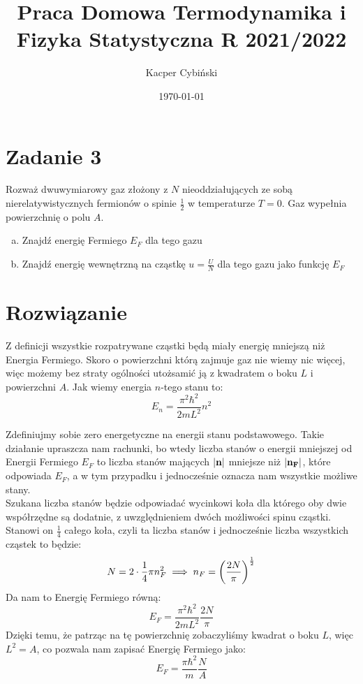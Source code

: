 \documentclass[12pt,a4paper]{article}
\title{Praca Domowa Termodynamika i Fizyka Statystyczna R 2021/2022}
\author{Kacper Cybiński}
\date{\today}
\begin{document}
\maketitle

\section{Zadanie 3}

Rozważ dwuwymiarowy gaz złożony z $N$ nieoddziałujących ze sobą nierelatywistycznych fermionów o spinie $\frac12$ w temperaturze $T = 0$. Gaz wypełnia powierzchnię o polu $A$.
\begin{enumerate}[a)]
    \item Znajdź energię Fermiego $E_F$ dla tego gazu \label{pkt_A}
    \item Znajdź energię wewnętrzną na cząstkę $u = \frac{U}{N}$ dla tego gazu jako funkcję $E_F$ \label{pkt_B}
\end{enumerate}

\section{Rozwiązanie}

Z definicji wszystkie rozpatrywane cząstki będą miały energię mniejszą niż Energia Fermiego. Skoro o powierzchni którą zajmuje gaz nie wiemy nic więcej, więc możemy bez straty ogólności utożsamić ją z kwadratem o boku $L$ i powierzchni $A$. Jak wiemy energia $n$-tego stanu to:
\[
    E_n = \frac{\pi^2 \hbar^2}{2 m L^2} n^2    
\]

Zdefiniujmy sobie zero energetyczne na energii stanu podstawowego. Takie działanie upraszcza nam rachunki, bo wtedy liczba stanów o energii mniejszej od Energii Fermiego $E_F$ to liczba stanów mających $\abs{\vb{n}}$ mniejsze niż $\abs{\vb{n_F}}$, które odpowiada $E_F$, a w tym przypadku i jednocześnie oznacza nam wszystkie możliwe stany.\\
Szukana liczba stanów będzie odpowiadać wycinkowi koła dla którego oby dwie współrzędne są dodatnie, z uwzględnieniem dwóch możliwości spinu cząstki. Stanowi on $\frac14$ całego koła, czyli ta liczba stanów i jednocześnie liczba wszystkich cząstek to będzie:
\[
    N = 2 \cdot \frac14 \pi n_F^2 \implies n_F = \qty(\frac{2N}{\pi})^{\frac12}
\] 
Da nam to Energię Fermiego równą:
\[
    E_F = \frac{\pi^2 \hbar^2}{2 m L^2} \frac{2N}{\pi}    
\]
Dzięki temu, że patrząc na tę powierzchnię zobaczyliśmy kwadrat o boku $L$, więc $L^2 = A$, co pozwala nam zapisać Energię Fermiego jako:
\[
    E_F = \frac{\pi \hbar^2}{m} \frac{N}{A}    
\]
\end{document}
